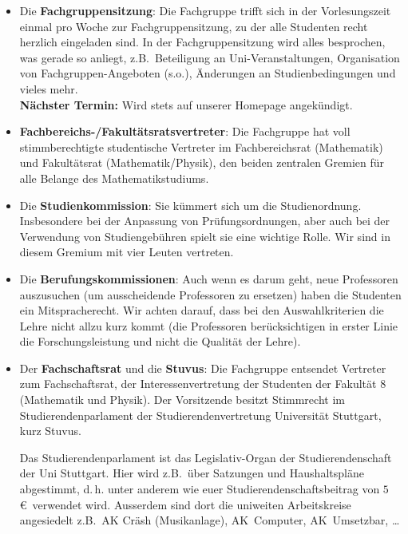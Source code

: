 \begin{itemize}
\item
Die {\bf Fachgruppensitzung}:
Die Fachgruppe trifft sich in der Vorlesungszeit
einmal pro Woche zur Fachgruppensitzung,
zu der alle Studenten recht herzlich eingeladen sind.
In der Fachgruppensitzung wird alles besprochen,
was gerade so anliegt, z.B.\ Beteiligung an Uni-Veranstaltungen,
Organisation von Fachgruppen-Angeboten (s.o.),
Änderungen an Studienbedingungen und vieles mehr.\\
{\bf Nächster Termin:} Wird stets auf unserer Homepage angekündigt.

\item
{\bf Fachbereichs-/Fakultätsratsvertreter}:
Die Fachgruppe hat voll stimmberechtigte studentische Vertreter
im Fachbereichsrat (Mathematik) und Fakultätsrat (Mathematik/Physik),
den beiden zentralen Gremien für alle Belange des Mathematikstudiums.

\item
Die {\bf Studienkommission}:
Sie kümmert sich um die Studienordnung.
Insbesondere bei der Anpassung von Prüfungsordnungen,
aber auch bei der Verwendung von Studiengebühren
spielt sie eine wichtige Rolle.
Wir sind in diesem Gremium mit vier Leuten vertreten.

\item
Die {\bf Berufungskommissionen}:
Auch wenn es darum geht, neue Professoren auszusuchen
(um ausscheidende Professoren zu ersetzen)
haben die Studenten ein Mitspracherecht.
Wir achten darauf, dass bei den Auswahlkriterien
die Lehre nicht allzu kurz kommt
(die Professoren berücksichtigen in erster Linie die
Forschungsleistung und nicht die Qualität der Lehre).

\item
Der {\bf Fachschaftsrat} und die {\bf Stuvus}:
Die Fachgruppe entsendet Vertreter zum Fachschaftsrat,
der Interessenvertretung der Studenten der Fakultät $8$
(Mathematik und Physik).
Der Vorsitzende besitzt Stimmrecht im Studierendenparlament
der Studierendenvertretung Universität Stuttgart, kurz Stuvus. 

\newpage
Das Studierendenparlament ist das Legislativ-Organ
der Studierendenschaft der Uni Stuttgart.
Hier wird z.B.\ über Satzungen und Haushaltspläne abgestimmt,
d.\,h. unter anderem wie euer Studierendenschaftsbeitrag
von $5$\euro\ verwendet wird.
Ausserdem sind dort die uniweiten Arbeitskreise angesiedelt
z.B.\ AK Cräsh (Musikanlage), AK~Computer, AK~Umsetzbar, \dots \\
\end{itemize}

